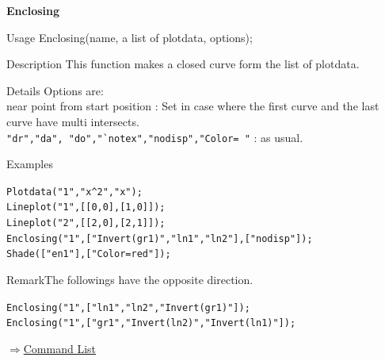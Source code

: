 \documentclass[papersize,a4paper,12pt]{article}
\newenvironment{cmd}[2]{
\hypertarget{#2}{}
\begin{center}{\bf\large #1}\end{center}
\begin{description}
}{
\end{description}
\begin{flushright} \hyperlink{functionlist}{$\Rightarrow$Command List}\end{flushright}
}
\begin{document}
\begin{cmd}{Enclosing}{enclosing}
\item[Usage]Enclosing(name, a list of plotdata, options);
\item[Description]This function makes a closed curve form the list of plotdata.
\item[Details]Options are:\\
near point from start position : Set in case where the first curve and the last curve have multi intersects.\\
\verb|"dr","da", "do","`notex","nodisp","Color= "| : as usual.
\item[Examples]\mbox{}

\verb|Plotdata("1","x^2","x");|\\
\verb|Lineplot("1",[[0,0],[1,0]]);|\\
\verb|Lineplot("2",[[2,0],[2,1]]);|\\
\verb|Enclosing("1",["Invert(gr1)","ln1","ln2"],["nodisp"]);|\\
\verb|Shade(["en1"],["Color=red"]);|

\begin{center}

\end{center}

\item{Remark}The followings have the opposite direction.

\verb|Enclosing("1",["ln1","ln2","Invert(gr1)"]);|\\
\verb|Enclosing("1",["gr1","Invert(ln2)","Invert(ln1)"]);|
\end{cmd}
\end{document}
